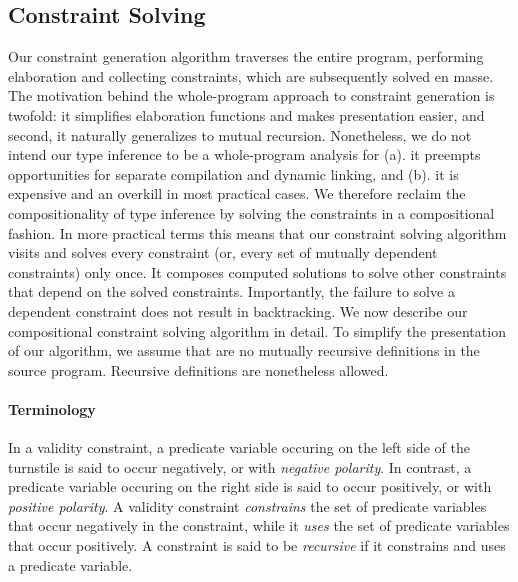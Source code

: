 \subsection{Constraint Solving}
\label{sec:fb-constraintsolving}

Our constraint generation algorithm traverses the entire program,
performing elaboration and collecting constraints, which are
subsequently solved en masse. The motivation behind the whole-program
approach to constraint generation is twofold: it simplifies
elaboration functions and makes presentation easier, and second, it
naturally generalizes to mutual recursion. Nonetheless, we do not
intend our type inference to be a whole-program analysis for (a). it
preempts opportunities for separate compilation and dynamic linking,
and (b). it is expensive and an overkill in most practical cases. We
therefore reclaim the compositionality of type inference by solving
the constraints in a compositional fashion. In more practical terms
this means that our constraint solving algorithm visits and solves
every constraint (or, every set of mutually dependent constraints)
only once. It composes computed solutions to solve other constraints
that depend on the solved constraints. Importantly, the failure to
solve a dependent constraint does not result in backtracking. We now
describe our compositional constraint solving algorithm in detail. To
simplify the presentation of our algorithm, we assume that are no
mutually recursive definitions in the source program. Recursive
definitions are nonetheless allowed.

\paragraph{Terminology} In a validity constraint, a predicate variable
occuring on the left side of the turnstile is said to occur
negatively, or with \emph{negative polarity}. In contrast, a predicate
variable occuring on the right side is said to occur positively, or
with \emph{positive polarity}. A validity constraint
\emph{constrains} the set of predicate variables that occur
negatively in the constraint, while it \emph{uses} the set of
predicate variables that occur positively. A constraint is said to be
\emph{recursive} if it constrains and uses a predicate variable.

